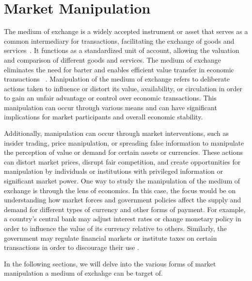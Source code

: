 \section{Market Manipulation}
The medium of exchange is a widely accepted instrument or asset that serves as a common intermediary for transactions,
facilitating the exchange of goods and services~\cite{mankiw2014principles}. It functions as a standardized unit of
account, allowing the valuation and comparison of different goods and services. The medium of exchange eliminates the
need for barter and enables efficient value transfer in economic transactions ~\cite{friedman2004money}. Manipulation of
the medium of exchange refers to deliberate actions taken to influence or distort its value, availability, or
circulation in order to gain an unfair advantage or control over economic transactions. This manipulation can occur
through various means and can have significant implications for market participants and overall economic stability.

Additionally, manipulation can occur through market interventions, such as insider trading, price manipulation, or
spreading false information to manipulate the perception of value or demand for certain assets or currencies. These
actions can distort market prices, disrupt fair competition, and create opportunities for manipulation by individuals or
institutions with privileged information or significant market power. One way to study the manipulation of the medium of
exchange is through the lens of economics. In this case, the focus would be on understanding how market forces and
government policies affect the supply and demand for different types of currency and other forms of payment. For
example, a country's central bank may adjust interest rates or change monetary policy in order to influence the value of
its currency relative to others. Similarly, the government may regulate financial markets or institute taxes on certain
transactions in order to discourage their use \cite{domanski2011currency}.

In the following sections, we will delve into the various forms of market manipulation a medium of exchahge can be
target of.

